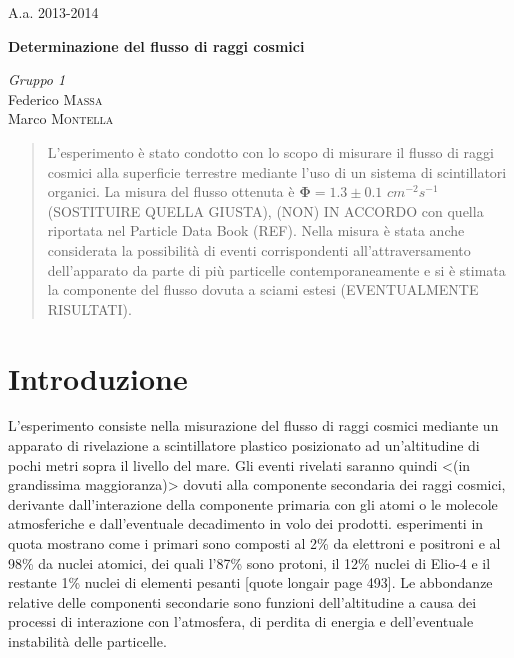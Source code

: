 \documentclass[11pt]{article}
\begin{document}
\printindex
\Large{A.a. 2013-2014}
\vspace{10cm}
\begin{center}
\Huge\textbf{Determinazione del flusso di raggi cosmici}
\end{center}

\vspace{2cm}
\begin{flushleft}
\textit{Gruppo \textsc{1}} \\
\medskip
Federico \textsc{Massa} \\ 
Marco \textsc{Montella}



\newpage

\begin{abstract}
\justify
L'esperimento è stato condotto con lo scopo di misurare il flusso di raggi cosmici alla superficie terrestre mediante l'uso di un sistema di scintillatori organici. La misura del flusso ottenuta è $\mathbf{\Phi} = 1.3 \pm 0.1$ $cm^{-2}s^{-1}$ (SOSTITUIRE QUELLA GIUSTA), (NON) IN ACCORDO con quella riportata nel Particle Data Book (REF). Nella misura è stata anche considerata la possibilità di eventi corrispondenti all'attraversamento dell'apparato da parte di più particelle contemporaneamente e si è stimata la componente del flusso dovuta a sciami estesi (EVENTUALMENTE RISULTATI). 

\end{abstract}
\bigskip

\section{Introduzione}
\justify
L'esperimento consiste nella misurazione del flusso di raggi cosmici mediante un apparato di rivelazione a scintillatore plastico posizionato ad un'altitudine di pochi metri sopra il livello del mare. Gli eventi rivelati saranno quindi <(in grandissima maggioranza)> dovuti alla componente secondaria dei raggi cosmici, derivante dall'interazione della componente primaria con gli atomi o le molecole atmosferiche e dall'eventuale decadimento in volo dei prodotti.
esperimenti in quota mostrano come i primari sono composti al 2\% da elettroni e positroni e al 98\% da nuclei atomici, dei quali l'87\% sono protoni, il 12\% nuclei di Elio-4 e il restante 1\% nuclei di elementi pesanti [quote longair page 493].
Le abbondanze relative delle componenti secondarie sono funzioni dell'altitudine a causa dei processi di interazione con l'atmosfera, di perdita di energia e dell'eventuale instabilità delle particelle. 


\end{flushleft}
\end{document}
